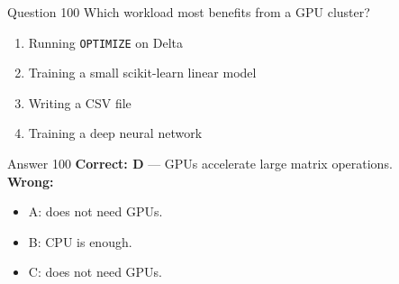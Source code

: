 \documentclass[aspectratio=169,11pt]{beamer}
\begin{document}
\begin{frame}{Question 100}
Which workload most benefits from a GPU cluster?
\begin{enumerate}[label=\Alph*.]
\item Running \texttt{OPTIMIZE} on Delta
\item Training a small scikit-learn linear model
\item Writing a CSV file
\item Training a deep neural network
\end{enumerate}
\end{frame}
\begin{frame}{Answer 100}
\textbf{Correct: D} --- GPUs accelerate large matrix operations.\\
\vspace{0.5em}
\textbf{Wrong:}
\begin{itemize}
\item A: does not need GPUs.
\item B: CPU is enough.
\item C: does not need GPUs.
\end{itemize}
\end{frame}
\end{document}
